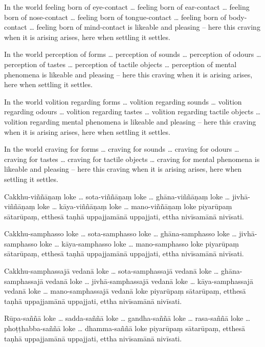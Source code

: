 In the world feeling born of eye-contact \ldots{} feeling born of ear-contact
\ldots{} feeling born of nose-contact \ldots{} feeling born of tongue-contact
\ldots{} feeling born of body-contact \ldots{} feeling born of mind-contact is
likeable and pleasing -- here this craving when it is arising arises, here when
settling it settles.

In the world perception of forms \ldots{} perception of sounds \ldots{}
perception of odours \ldots{} perception of tastes \ldots{} perception of
tactile objects \ldots{} perception of mental phenomena is likeable and pleasing
-- here this craving when it is arising arises, here when settling it settles.

In the world volition regarding forms \ldots{} volition regarding sounds
\ldots{} volition regarding odours \ldots{} volition regarding tastes \ldots{}
volition regarding tactile objects \ldots{} volition regarding mental phenomena
is likeable and pleasing -- here this craving when it is arising arises, here
when settling it settles.

In the world craving for forms \ldots{} craving for sounds \ldots{} craving for
odours \ldots{} craving for tastes \ldots{} craving for tactile objects \ldots{}
craving for mental phenomena is likeable and pleasing -- here this craving when
it is arising arises, here when settling it settles.

\paliPage

Cakkhu-viññāṇaṃ loke \ldots{} sota-viññāṇaṃ loke \ldots{} ghāna-viññāṇaṃ loke
\ldots{} jivhā-viññāṇaṃ loke \ldots{} kāya-viññāṇaṃ loke \ldots{} mano-viññāṇaṃ
loke piyarūpaṃ sātarūpaṃ, etthesā taṇhā uppajjamānā uppajjati, ettha nivīsamānā
nivīsati.

Cakkhu-samphasso loke \ldots{} sota-samphasso loke \ldots{} ghāna-samphasso loke
\ldots{} jivhā-samphasso loke \ldots{} kāya-samphasso loke \ldots{} mano-samphasso
loke piyarūpaṃ sātarūpaṃ, etthesā taṇhā uppajjamānā uppajjati, ettha nivīsamānā
nivīsati.

Cakkhu-samphassajā vedanā loke \ldots{} sota-samphassajā vedanā loke \ldots{}
ghāna-samphassajā vedanā loke \ldots{} jivhā-samphassajā vedanā loke \ldots{}
kāya-samphassajā vedanā loke \ldots{} mano-samphassajā vedanā loke piyarūpaṃ
sātarūpaṃ, etthesā taṇhā uppajjamānā uppajjati, ettha nivīsamānā nivīsati.

Rūpa-saññā loke \ldots{} sadda-saññā loke \ldots{} gandha-saññā loke \ldots{}
rasa-saññā loke \ldots{} phoṭṭhabba-saññā loke \ldots{} dhamma-saññā loke piyarūpaṃ
sātarūpaṃ, etthesā taṇhā uppajjamānā uppajjati, ettha nivīsamānā nivīsati.

